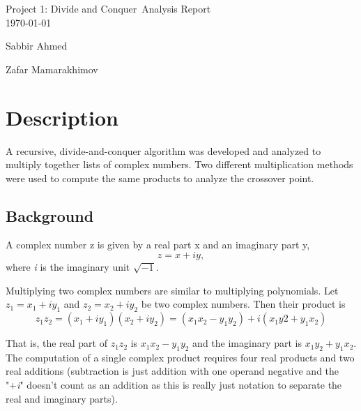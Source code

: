 \documentclass[usletter, 12pt]{article}
\newcommand{\project}{Project 1: Divide and Conquer}
\newcommand{\Sabbir}{Sabbir Ahmed}
\newcommand{\Zafar}{Zafar Mamarakhimov}
\begin{document}

    \begin{titlepage}

        \vspace*{\fill} %
        \begin{center}

            {\LARGE \project~Analysis Report}\\ [1.5cm]

            \today
            
            \vspace*{\fill}

            \Sabbir

            \Zafar

        \end{center}
        \vspace*{\fill} %

    \end{titlepage}

    \section{Description}
    A recursive, divide-and-conquer algorithm was developed and analyzed to multiply together lists of complex numbers. Two different multiplication methods were used to compute the same products to analyze the crossover point.

        \subsection{Background}
        A complex number z is given by a real part x and an imaginary part y,
            \[ z=x+iy, \]
        where \textit{i} is the imaginary unit $\sqrt{-1}$.

        Multiplying two complex numbers are similar to multiplying polynomials. Let $z_{1}=x_{1}+iy_{1}$ and $z_{2}=x_{2}+iy_{2}$ be two complex numbers. Then their product is
            \[ z_{1}z_{2}=(x_{1}+iy_{1})(x_{2}+iy_{2})=(x_{1}x_{2}-y_{1}y_{2})+i(x_{1}y2+y_{1}x_{2}) \]

        That is, the real part of $z_{1}z_{2}$ is $x_{1}x_{2}-y_{1}y_{2}$ and the imaginary part is $x_{1}y_{2}+y_{1}x_{2}$. The computation of a single complex product requires four real products and two real additions (subtraction is just addition with one operand negative and the "+\textit{i}" doesn't count as an addition as this is really just notation to separate the real and imaginary parts).
\end{document}
